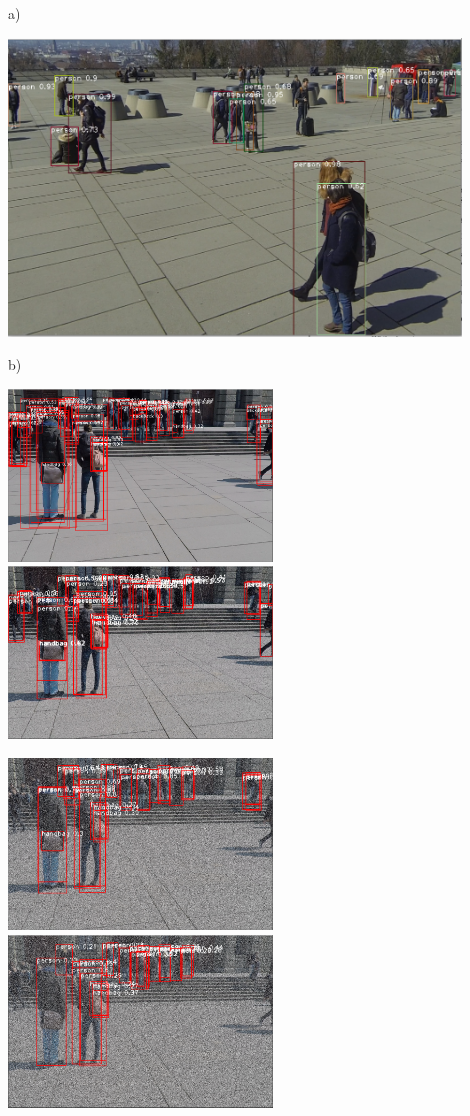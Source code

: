 \documentclass[12pt]{report}
\begin{document}
a)

\includegraphics[width=120mm]{./images/appendix/NMS0.6.PNG}

b)

\includegraphics[width=70mm]{./images/appendix/NoConfidenceNoAug.PNG}
\includegraphics[width=70mm]{./images/appendix/NoConfidenceAug10.PNG}

\includegraphics[width=70mm]{./images/appendix/NoConfidenceAug40.PNG}
\includegraphics[width=70mm]{./images/appendix/NoConfidenceAug50.PNG}
\end{document}
